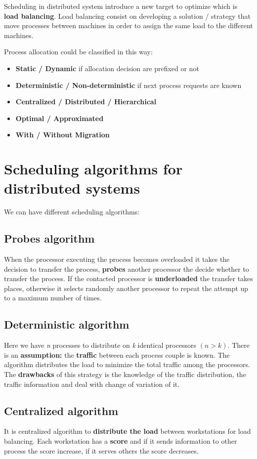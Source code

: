 Scheduling in distributed system introduce a new target to optimize which is \textbf{load balancing}. Load balancing consist on developing a solution / strategy that move processes between machines in order to assign the same load to the different machines.

Process allocation could be classified in this way:
\begin{itemize}
    \item \textbf{Static / Dynamic} if allocation decision are prefixed or not
    \item \textbf{Deterministic / Non-deterministic} if next process requests are known
    \item \textbf{Centralized / Distributed / Hierarchical}
    \item \textbf{Optimal / Approximated}
    \item \textbf{With / Without Migration}
\end{itemize}


\section{Scheduling algorithms for distributed systems}
We can have different scheduling algorithms:
\subsection{Probes algorithm}
When the processor executing the process becomes overloaded it takes the decision to transfer the process, \textbf{probes} another processor the decide whether to transfer the process. If the contacted processor is \textbf{underloaded} the transfer takes places, otherwise it selects randomly another processor to repeat the attempt up to a maximum number of times.

\subsection{Deterministic algorithm}
Here we have \textit{n} processes to distribute on \textit{k} identical processors \((n > k)\). There is an \textbf{assumption:} the \textbf{traffic} between each process couple is known. The algorithm distributes the load to minimize the total traffic among the processors. The \textbf{drawbacks} of this strategy is the knowledge of the traffic distribution, the traffic information and deal with change of variation of it.

\subsection{Centralized algorithm}
It is centralized algorithm to \textbf{distribute the load} between workstations for load balancing. Each workstation has a \textbf{score} and if it sends information to other process the score increase, if it serves others the score decreases.

